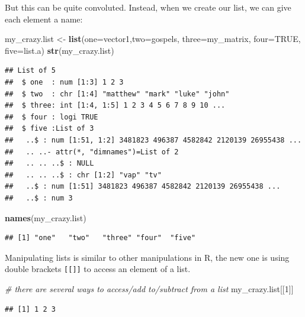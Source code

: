 \documentclass[]{article}
\newenvironment{Shaded}{\begin{snugshade}}{\end{snugshade}}
\newcommand{\KeywordTok}[1]{\textcolor[rgb]{0.13,0.29,0.53}{\textbf{#1}}}
\newcommand{\DataTypeTok}[1]{\textcolor[rgb]{0.13,0.29,0.53}{#1}}
\newcommand{\DecValTok}[1]{\textcolor[rgb]{0.00,0.00,0.81}{#1}}
\newcommand{\StringTok}[1]{\textcolor[rgb]{0.31,0.60,0.02}{#1}}
\newcommand{\CommentTok}[1]{\textcolor[rgb]{0.56,0.35,0.01}{\textit{#1}}}
\newcommand{\OtherTok}[1]{\textcolor[rgb]{0.56,0.35,0.01}{#1}}
\newcommand{\NormalTok}[1]{#1}
\begin{document}
But this can be quite convoluted. Instead, when we create our list, we
can give each element a name:

\begin{Shaded}
\begin{Highlighting}[]
\NormalTok{my_crazy.list <-}\StringTok{ }\KeywordTok{list}\NormalTok{(}\DataTypeTok{one=}\NormalTok{vector1,}\DataTypeTok{two=}\NormalTok{gospels, }\DataTypeTok{three=}\NormalTok{my_matrix, }\DataTypeTok{four=}\OtherTok{TRUE}\NormalTok{, }\DataTypeTok{five=}\NormalTok{list.a)}
\KeywordTok{str}\NormalTok{(my_crazy.list)}
\end{Highlighting}
\end{Shaded}

\begin{verbatim}
## List of 5
##  $ one  : num [1:3] 1 2 3
##  $ two  : chr [1:4] "matthew" "mark" "luke" "john"
##  $ three: int [1:4, 1:5] 1 2 3 4 5 6 7 8 9 10 ...
##  $ four : logi TRUE
##  $ five :List of 3
##   ..$ : num [1:51, 1:2] 3481823 496387 4582842 2120139 26955438 ...
##   .. ..- attr(*, "dimnames")=List of 2
##   .. .. ..$ : NULL
##   .. .. ..$ : chr [1:2] "vap" "tv"
##   ..$ : num [1:51] 3481823 496387 4582842 2120139 26955438 ...
##   ..$ : num 3
\end{verbatim}

\begin{Shaded}
\begin{Highlighting}[]
\KeywordTok{names}\NormalTok{(my_crazy.list)}
\end{Highlighting}
\end{Shaded}

\begin{verbatim}
## [1] "one"   "two"   "three" "four"  "five"
\end{verbatim}

Manipulating lists is similar to other manipulations in R, the new one
is using double brackets \texttt{[[]]} to access an element of a list.

\begin{Shaded}
\begin{Highlighting}[]
\CommentTok{# there are several ways to access/add to/subtract from a list}
\NormalTok{my_crazy.list[[}\DecValTok{1}\NormalTok{]]}
\end{Highlighting}
\end{Shaded}

\begin{verbatim}
## [1] 1 2 3
\end{verbatim}
\end{document}
